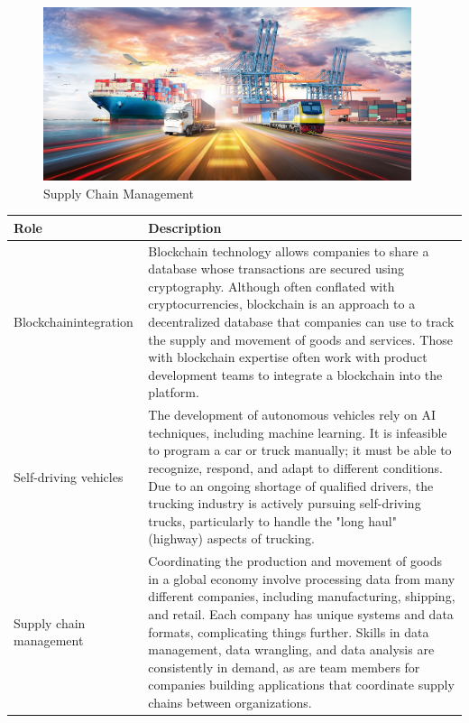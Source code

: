 \begin{figure}[H]
	\begin{center}
		\caption{Supply Chain Management}
		\vskip 4pt
		\includegraphics[height=2in]{images/careers/iStock-1399747292.small.jpg}
	\end{center}
\end{figure}

\begin{table}[H]
	\begin{center}
		\begin{tabular}{p{1in}|p{3.4in}} 
			\textbf{Role} & \textbf{Description}\\
			\hline
			Blockchain\linebreak integration & Blockchain technology allows companies to share a database whose transactions are secured using cryptography. Although often conflated with cryptocurrencies, blockchain is an approach to a decentralized database that companies can use to track the supply and movement of goods and services. Those with blockchain expertise often work with product development teams to integrate a blockchain into the platform.\\
			\hline
			Self-driving vehicles & The development of autonomous vehicles rely on AI techniques, including machine learning. It is infeasible to program a car or truck manually; it must be able to recognize, respond, and adapt to different conditions. Due to an ongoing shortage of qualified drivers, the trucking industry is actively pursuing self-driving trucks, particularly to handle the "long haul" (highway) aspects of trucking.\\
			\hline
			Supply chain management & Coordinating the production and movement of goods in a global economy involve processing data from many different companies, including manufacturing, shipping, and retail. Each company has unique systems and data formats, complicating things further. Skills in data management, data wrangling, and data analysis are consistently in demand, as are team members for companies building applications that coordinate supply chains between organizations.\\
			\hline
		\end{tabular}
	\end{center}
\end{table}

